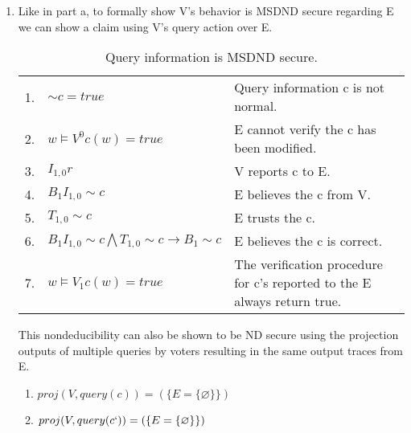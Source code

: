 \documentclass[journal,onecolumn]{IEEEtran}
\begin{document}
\begin{enumerate}
\begin{enumerate}
      \item Like in part a, to formally show V's behavior is MSDND secure regarding E we can show a claim using V's query action over E.  
      
      \begin{table}[H]
        \caption{Query information is MSDND secure.}
        \centering
        \begin{tabular}{lll}
        1.  & ${\sim} c = true$                                                     & Query information c is not normal.                                                       \\
        2.  & $w \vDash V^0 c(w) = true$                                            & E cannot verify the c has been modified.                                 \\
        3.  & $I_{1,0}r$                                                              & V reports c to E.                                                \\
        4.  & $B_1I_{1,0} {\sim} c$                                                   & E believes the c from V.                                     \\
        5.  & $T_{1,0} {\sim} c$                                                      & E trusts the c.                                                          \\
        6.  & $B_1I_{1,0} {\sim} c \bigwedge T_{1,0} {\sim} c \rightarrow B_1 {\sim} c$ & E believes the c is correct.                                             \\
        7. & $w \vDash V_1 c(w) = true$                                             & The verification procedure for c's reported to the E always return true.
        \end{tabular}
      \end{table}
      
      This nondeducibility can also be shown to be ND secure using the projection outputs of multiple queries by voters resulting in the same output traces from E. \\

      \begin{enumerate}
        \item $proj(V, query(c)) = (\{E = \{\varnothing\}\})$       
        \item $proj(V, query(c`)) = (\{E = \{\varnothing\}\})$
      \end{enumerate}


\end{enumerate}
\end{enumerate}
\end{document}
